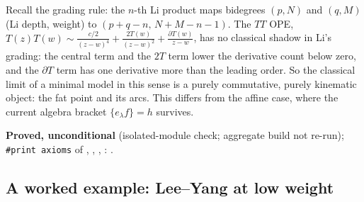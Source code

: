 \begin{physics}
Recall the grading rule: the $n$-th Li product maps bidegrees $(p,N)$ and $(q,M)$ (Li depth, weight) to $(p+q-n,\,N+M-n-1)$.
The $TT$ OPE, $T(z)T(w)\sim\frac{c/2}{(z-w)^4}+\frac{2T(w)}{(z-w)^2}+\frac{\partial T(w)}{z-w}$, has no classical shadow in Li's
grading: the central term and the $2T$ term lower the derivative count below zero, and the $\partial T$ term has one derivative more
than the leading order. So the classical limit of a minimal model in this sense is a purely commutative, purely kinematic object:
the fat point and its arcs. This differs from the affine case, where the current algebra bracket $\{e_\lambda f\}=h$ survives.
\end{physics}

\begin{status}
\textbf{Proved, unconditional} (isolated-module check; aggregate build not re-run); \texttt{\#print axioms} of , , ,
: .
\end{status}

\subsection{A worked example: Lee--Yang at low weight}

